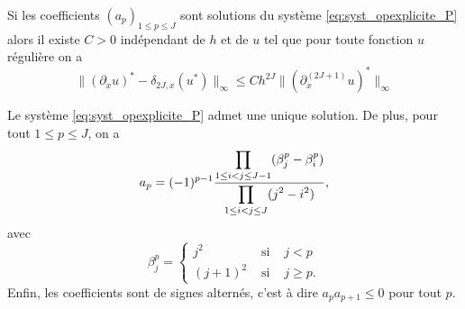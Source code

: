 \begin{corollaire}
Si les coefficients $(a_p)_{1 \leq p \leq J}$ sont solutions du système \eqref{eq:syst_opexplicite_P} alors il existe $C>0$ indépendant de $h$ et de $u$ tel que pour toute fonction $u$ régulière on a 
\begin{equation}
\| (\partial_x u)^* - \delta_{2J,x}(u^*) \|_{\infty} \leq C h^{2J} \| (\partial^{(2J+1)}_x u)^* \|_{\infty}
\end{equation} 
\end{corollaire}

\begin{proposition}
Le système \eqref{eq:syst_opexplicite_P} admet une unique solution. De plus, pour tout $1 \leq p \leq J$, on a
\begin{equation}
a_p = (-1)^{p-1} \dfrac{\displaystyle\prod\limits_{1 \leq i <j \leq J-1}(\beta_j^p - \beta_i^p)}{\displaystyle\prod\limits_{1 \leq i <j \leq J}(j^2 - i^2)},
\end{equation}
avec 
\begin{equation}
\beta^p_j = \left\lbrace
\begin{array}{ccl}
j^2 & \text{ si } & j<p \\
(j+1)^2 & \text{ si } & j \geq p.
\end{array}
\right.
\end{equation}
Enfin, les coefficients sont de signes alternés, c'est à dire $a_p a_{p+1} \leq 0$ pour tout $p$.
\end{proposition}

